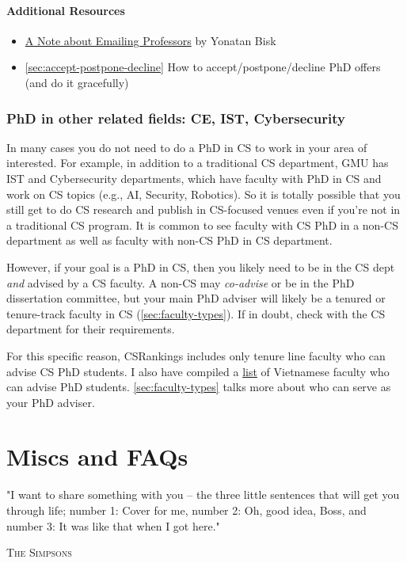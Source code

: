 \documentclass[oneside,11pt]{memoir}
\begin{document}
\subsubsection*{Additional Resources}
\begin{itemize}
  \item \href{https://yonatanbisk.com/emailing_professors.html}{A Note about Emailing Professors} by Yonatan Bisk
  \item \autoref{sec:accept-postpone-decline} How to accept/postpone/decline PhD offers (and do it gracefully)
\end{itemize}

\subsection{PhD in other related fields: CE, IST, Cybersecurity}\label{sec:related-fields}

In many cases you do not need to do a PhD in CS to work in your area of interested. For example, in addition to a traditional CS department, GMU has IST and Cybersecurity departments, which have faculty  with PhD in CS and work on CS topics (e.g., AI, Security, Robotics).  So it is totally possible that you still get to do CS research and publish in CS-focused venues even if you're not in a traditional CS program.  It is  common to see faculty with CS PhD in a non-CS department as well as faculty with non-CS PhD in CS department.  

However, if your goal is a PhD in CS, then you likely need to be in the CS dept \emph{and} advised by a CS faculty. A non-CS may \emph{co-advise} or be in the PhD dissertation committee, but your main PhD adviser will likely be a tenured or tenure-track faculty in CS (\autoref{sec:faculty-types}). If in doubt, check with the CS department for their requirements.

For this specific reason,  CSRankings includes only tenure line faculty who can advise CS PhD students. I also have compiled a \href{https://github.com/dynaroars/dynaroars.github.io/wiki/Viet-CS-Profs-US}{list} of Vietnamese faculty who can advise PhD students. \autoref{sec:faculty-types} talks more about who can serve as your PhD adviser.


\chapter{Miscs and FAQs}
\epigraph{"I want to share something with you – the three little sentences that will get you through life; number 1: Cover for me, number 2: Oh, good idea, Boss, and number 3: It was like that when I got here."}{\textsc{The Simpsons}}
\end{document}
